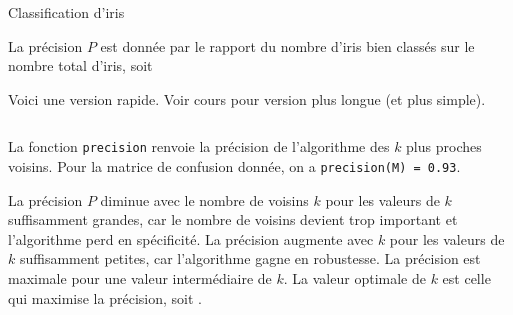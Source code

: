 \begin{exo}[PC][2][devoir]{Classification d'iris}
{\begin{table}[H]
  \end{table}
}

  \begin{quest}
    {
      La précision $P$ est donnée par le rapport du nombre d'iris bien classés sur le nombre total d'iris, soit
    }

    {
      Voici une version rapide. Voir cours pour version plus longue (et plus simple).
        \inputminted[linenos=true,frame=single]{python}{\pathtoexos/Info/Scripts/ia_precision_rapide.py}
      La fonction \texttt{precision} renvoie la précision de l'algorithme des $k$ plus proches voisins. Pour la matrice de confusion donnée, on a \texttt{precision(M) = 0.93}.
    }

    {
      La précision $P$ diminue avec le nombre de voisins $k$ pour les valeurs de $k$ suffisamment grandes,
      car le nombre de voisins devient trop important et l'algorithme perd en spécificité. La précision augmente avec $k$ pour les valeurs de $k$ suffisamment petites, car l'algorithme gagne en robustesse. La précision est maximale pour une valeur intermédiaire de $k$. La valeur optimale de $k$ est celle qui maximise la précision, soit .
    }

\end{quest}
\end{exo}
